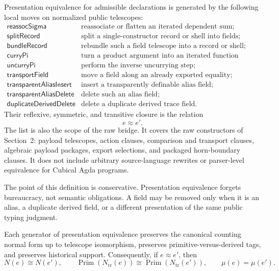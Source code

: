 \documentclass{lmcs}
\begin{document}
\begin{defi}
Presentation equivalence for admissible declarations is generated by the following local
moves on normalized public telescopes:
\[
\begin{array}{ll}
\mathsf{reassocSigma} & \text{reassociate or flatten an iterated dependent sum;}\\
\mathsf{splitRecord} & \text{split a single-constructor record or shell into fields;}\\
\mathsf{bundleRecord} & \text{rebundle such a field telescope into a record or shell;}\\
\mathsf{curryPi} & \text{turn a product argument into an iterated function telescope;}\\
\mathsf{uncurryPi} & \text{perform the inverse uncurrying step;}\\
\mathsf{transportField} & \text{move a field along an already exported equality;}\\
\mathsf{transparentAliasInsert} & \text{insert a transparently definable alias field;}\\
\mathsf{transparentAliasDelete} & \text{delete such an alias field;}\\
\mathsf{duplicateDerivedDelete} & \text{delete a duplicate derived trace field.}
\end{array}
\]
Their reflexive, symmetric, and transitive closure is the relation
\[
  e \approx e'.
\]
The list is also the scope of the raw bridge.  It covers the raw constructors of
Section~2: payload telescopes, action clauses, comparison and transport clauses, algebraic
payload packages, export selections, and packaged horn-boundary clauses.  It does not include
arbitrary source-language rewrites or parser-level equivalence for Cubical Agda programs.
\end{defi}

The point of this definition is conservative.  Presentation equivalence forgets bureaucracy,
not semantic obligations.  A field may be removed only when it is an alias, a duplicate
derived field, or a different presentation of the same public typing judgment.

\begin{prop}
Each generator of presentation equivalence preserves the canonical counting normal form up to
telescope isomorphism, preserves primitive-versus-derived tags, and preserves historical
support.  Consequently, if \(e\approx e'\), then
\[
  N(e) \cong N(e'),
  \qquad
  \operatorname{Prim}(N_{\mathrm{tr}}(e)) \cong
  \operatorname{Prim}(N_{\mathrm{tr}}(e')),
  \qquad
  \mu(e)=\mu(e').
\]
\end{prop}
\end{document}
